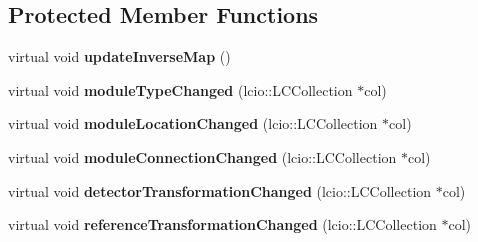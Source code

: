 \subsection*{Protected Member Functions}
\begin{DoxyCompactItemize}
\item 
virtual void {\bfseries update\-Inverse\-Map} ()\label{classCALICE_1_1BaseMappingIIProcessor_a60b39bae8ec80110e15b126c77138103}

\item 
virtual void {\bfseries module\-Type\-Changed} (lcio\-::\-L\-C\-Collection $\ast$col)\label{classCALICE_1_1BaseMappingIIProcessor_a016f786152f13a2dbb7a0ca9c0727a08}

\item 
virtual void {\bfseries module\-Location\-Changed} (lcio\-::\-L\-C\-Collection $\ast$col)\label{classCALICE_1_1BaseMappingIIProcessor_a9b65e70f55abef48ee724dab92c2b5db}

\item 
virtual void {\bfseries module\-Connection\-Changed} (lcio\-::\-L\-C\-Collection $\ast$col)\label{classCALICE_1_1BaseMappingIIProcessor_a4ea22fa131cd52bdb59a9dc0d49bb033}

\item 
virtual void {\bfseries detector\-Transformation\-Changed} (lcio\-::\-L\-C\-Collection $\ast$col)\label{classCALICE_1_1BaseMappingIIProcessor_ac82c048d8b7e3f28fe3b17b4855bb989}

\item 
virtual void {\bfseries reference\-Transformation\-Changed} (lcio\-::\-L\-C\-Collection $\ast$col)\label{classCALICE_1_1BaseMappingIIProcessor_a5e17c0ecedbbb704f21f94091aeb61f0}

\end{DoxyCompactItemize}
